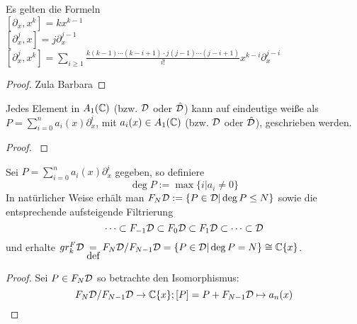 \begin{lem}
  Es gelten die Formeln\\
  $ [\partial_x,x^k] = kx^{k-1} $\\
  $ [\partial_x^j,x] = j\partial_x^{j-1} $\\
  $ [\partial_x^j,x^k] = \sum_{i\geq1}\frac{k(k-1)\cdots(k-i+1)
    \cdot j(j-1)\cdots(j-i+1)}{i!}x^{k-i}\partial_x^{j-i} $
\end{lem}
\begin{proof}
  Zula Barbara
\end{proof}

\begin{prop} \label{prop:weyl_eindeutige_schreibung}
  Jedes Element in $A_1({\mathbb C})$ (bzw. ${\mathcal{D}}$ oder $\hat{{\mathcal{D}}}$) kann auf eindeutige
  weiße als $P=\sum_{i=0}^na_i(x)\partial_x^i$, mit $a_i(x)\in A_1({\mathbb C})$ (bzw.
  ${\mathcal{D}}$ oder $\hat{{\mathcal{D}}}$), geschrieben werden. 
\end{prop}
\begin{proof}
  \cite[Proposition 1.2.3]{sabbah_cimpa90}
  \begin{comment}
    ein teil des Beweises ist "left as an exersice"
  \end{comment}
\end{proof}



\begin{defn}
  Sei $P=\sum_{i=0}^na_i(x)\partial_x^i$ gegeben, so definiere 
  \[
    \deg P:=\max\{i|a_i\neq 0\}
  \]
  In natürlicher Weise erhält man $F_N{\mathcal{D}}:=\{P\in{\mathcal{D}}|\deg P\leq N\}$ sowie die
  entsprechende aufsteigende Filtrierung
  \[
    \cdots\subset F_{-1}{\mathcal{D}}\subset F_{0}{\mathcal{D}}\subset F_{1}{\mathcal{D}}\subset\cdots\subset{\mathcal{D}}
  \]
  und erhalte $gr_k^F{\mathcal{D}}\underset{\mbox{def}}{=}F_N{\mathcal{D}}\slash F_{N-1}{\mathcal{D}}
  =\{P\in{\mathcal{D}}|\deg P=N\}\cong{\mathbb C}\{x\}$.
\end{defn}

\begin{proof}
  Sei $P\in F_N{\mathcal{D}}$ so betrachte den Isomorphismus:
  \[
    F_N{\mathcal{D}}\slash F_{N-1}{\mathcal{D}}\rightarrow {\mathbb C}\{x\}; [P]=P+F_{N-1}{\mathcal{D}}\mapsto a_n(x)
  \]
\end{proof}

